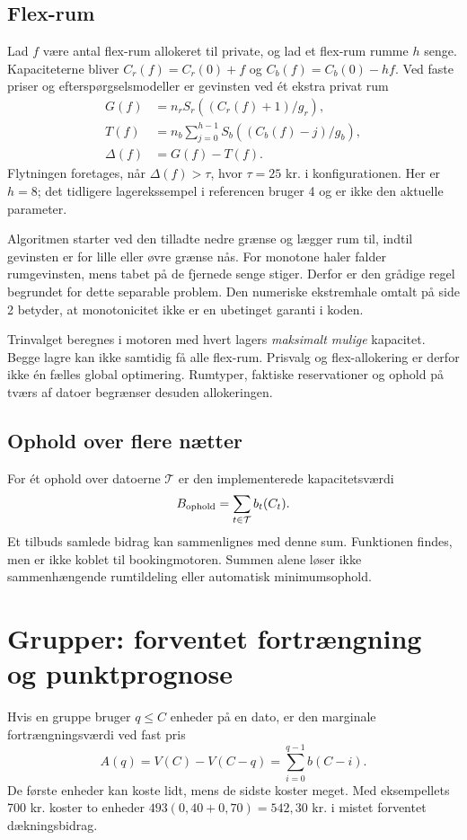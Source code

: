 \documentclass[11pt,a4paper]{article}
\newcommand{\code}[1]{\texttt{\small\detokenize{#1}}}
\begin{document}
\subsection{Flex-rum}
Lad $f$ være antal flex-rum allokeret til private, og lad et flex-rum rumme $h$
senge. Kapaciteterne bliver $C_r(f)=C_r(0)+f$ og $C_b(f)=C_b(0)-hf$.
Ved faste priser og efterspørgselsmodeller er gevinsten ved ét ekstra privat rum
\begin{align}
G(f)&=n_rS_r\left((C_r(f)+1)/g_r\right),\\
T(f)&=n_b\sum_{j=0}^{h-1}S_b\left((C_b(f)-j)/g_b\right),\\
\Delta(f)&=G(f)-T(f).
\end{align}
Flytningen foretages, når $\Delta(f)>\tau$, hvor $\tau=25$ kr. i
konfigurationen. Her er $h=8$; det tidligere lagerekssempel i referencen bruger
4 og er ikke den aktuelle parameter.

Algoritmen starter ved den tilladte nedre grænse og lægger rum til, indtil
gevinsten er for lille eller øvre grænse nås. For monotone haler falder
rumgevinsten, mens tabet på de fjernede senge stiger. Derfor er den grådige
regel begrundet for dette separable problem. Den numeriske ekstremhale omtalt
på side 2 betyder, at monotonicitet ikke er en ubetinget garanti i koden.

Trinvalget beregnes i motoren med hvert lagers \emph{maksimalt mulige}
kapacitet. Begge lagre kan ikke samtidig få alle flex-rum. Prisvalg og
flex-allokering er derfor ikke én fælles global optimering. Rumtyper,
faktiske reservationer og ophold på tværs af datoer begrænser desuden
allokeringen.

\subsection{Ophold over flere nætter}
For ét ophold over datoerne $\mathcal T$ er den implementerede kapacitetsværdi
\begin{equation}B_{\rm ophold}=\sum_{t\in\mathcal T}b_t(C_t).\end{equation}
Et tilbuds samlede bidrag kan sammenlignes med denne sum. Funktionen
\code{stay_value} findes, men er ikke koblet til bookingmotoren. Summen alene
løser ikke sammenhængende rumtildeling eller automatisk minimumsophold.

\newpage
\section{Grupper: forventet fortrængning og punktprognose}
Hvis en gruppe bruger $q\leq C$ enheder på en dato, er den marginale
fortrængningsværdi ved fast pris
\begin{equation}
A(q)=V(C)-V(C-q)=\sum_{i=0}^{q-1}b(C-i).
\end{equation}
De første enheder kan koste lidt, mens de sidste koster meget. Med eksempellets
700 kr. koster to enheder $493(0{,}40+0{,}70)=542{,}30$ kr. i mistet
forventet dækningsbidrag.
\end{document}
